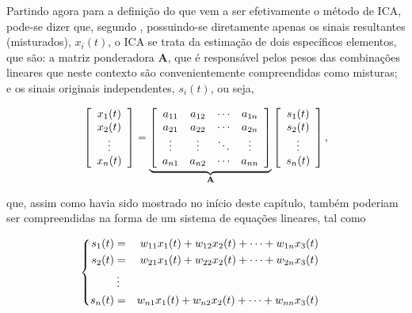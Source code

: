 
Partindo agora para a definição do que vem a ser efetivamente o método de ICA, pode-se dizer que, segundo \citep{hyvarinen2004independent}, possuindo-se diretamente apenas os sinais resultantes (misturados), $x_{i}(t)$, o ICA se trata da estimação de dois específicos elementos, que são: a matriz ponderadora $\mathbf{A}$, que é responsável pelos pesos das combinações lineares que neste contexto são convenientemente compreendidas como misturas; e os sinais originais independentes, $s_{i}(t)$, ou seja,

\begin{equation}
    \left[\begin{array}{c}
        x_{1}(t) \\
        x_{2}(t) \\
        \vdots \\
        x_{n}(t)
    \end{array}\right]
    =
    \underbrace{
    \left[\begin{array}{cccc}
        a_{11} & a_{12} & \cdots & a_{1n} \\
        a_{21} & a_{22} & \cdots & a_{2n} \\
        \vdots & \vdots & \ddots & \vdots \\
        a_{n1} & a_{n2} & \cdots & a_{nn}
    \end{array}\right]}_{\mathbf{A}}
    \left[\begin{array}{c}
        s_{1}(t) \\
        s_{2}(t) \\
        \vdots \\
        s_{n}(t)
    \end{array}\right],
    \vspace{0.2cm}
    \label{eq:bss_ica_mat}
\end{equation}

\noindent que, assim como havia sido mostrado no início deste capítulo, também poderiam ser compreendidas na forma de um sistema de equações lineares, tal como

\begin{equation}
\begin{cases}
\begin{aligned}
    s_{1}(t) & = & w_{11} x_{1}(t) +  w_{12} x_{2}(t) + \cdots + w_{1n} x_{3}(t) \\
    s_{2}(t) & = & w_{21} x_{1}(t) +  w_{22} x_{2}(t) + \cdots + w_{2n} x_{3}(t) \\
     & \hspace{0.08cm} \vdots & \\
    s_{n}(t) & = & w_{n1} x_{1}(t) +  w_{n2} x_{2}(t) + \cdots + w_{nn} x_{3}(t)
    \label{eq:bss_ica}
\end{aligned}
\end{cases}
\vspace{0.2cm}
\end{equation}

